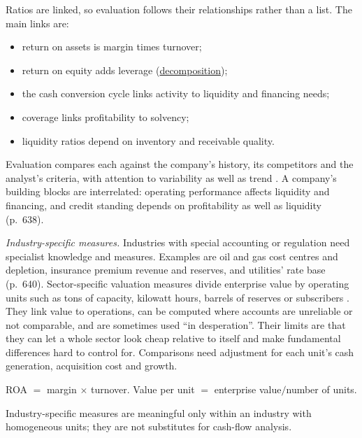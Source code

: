 \begin{qfmethod}\label{meth:ratio-based-evaluation}
 Ratios are linked, so evaluation follows their relationships rather than a list. The main links are:
\begin{itemize}
\item return on assets is margin times turnover;
\item return on equity adds leverage (\hyperref[meth:return-on-equity-decomposition]{decomposition});
\item the cash conversion cycle links activity to liquidity and financing needs;
\item coverage links profitability to solvency;
\item liquidity ratios depend on inventory and receivable quality.
\end{itemize}
Evaluation compares each against the company's history, its competitors and the analyst's criteria, with attention to variability as well as trend \citep[p.~35]{financial-statement-analysis-2009}. A company's building blocks are interrelated: operating performance affects liquidity and financing, and credit standing depends on profitability as well as liquidity (p.~638).

\emph{Industry-specific measures.} Industries with special accounting or regulation need specialist knowledge and measures. Examples are oil and gas cost centres and depletion, insurance premium revenue and reserves, and utilities' rate base (p.~640). Sector-specific valuation measures divide enterprise value by operating units such as tons of capacity, kilowatt hours, barrels of reserves or subscribers \citep[pp.~571--576]{investment-valuation-2012}. They link value to operations, can be computed where accounts are unreliable or not comparable, and are sometimes used ``in desperation''. Their limits are that they can let a whole sector look cheap relative to itself and make fundamental differences hard to control for. Comparisons need adjustment for each unit's cash generation, acquisition cost and growth.

 ROA $=$ margin $\times$ turnover. Value per unit $=$ enterprise value$/$number of units.

 Industry-specific measures are meaningful only within an industry with homogeneous units; they are not substitutes for cash-flow analysis.


\end{qfmethod}
